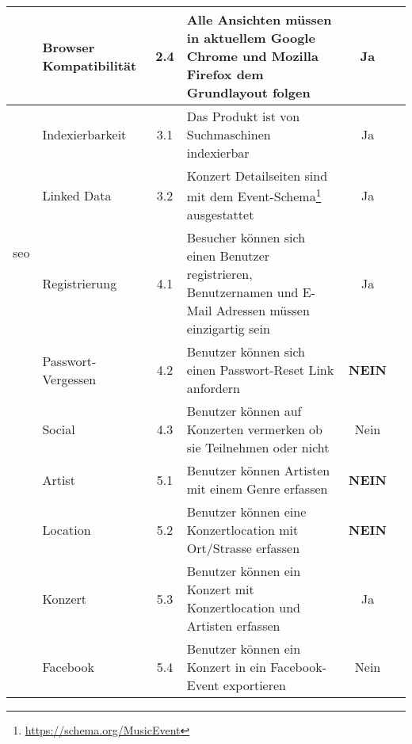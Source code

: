 \begin{longtable}[]{@{}p{1.9cm}p{2.5cm}cp{5.5cm}cc@{}}
                                  & Browser Kompatibilität     & 2.4          & Alle Ansichten müssen in aktuellem Google Chrome und Mozilla Firefox dem Grundlayout folgen                 & Ja                              \\
  \midrule
  \multirow{4}{*}{\acrshort{seo}} & Indexierbarkeit            & 3.1          & Das Produkt ist von Suchmaschinen indexierbar                                                               & Ja                              \\ \cline{2-6}
                                  & Linked Data                & 3.2          & Konzert Detailseiten sind mit dem Event-Schema\footnote{\url{https://schema.org/MusicEvent}} ausgestattet   & Ja                              \\
  \midrule
  \multirow{8}{*}{Benutzer}       & Registrierung              & 4.1          & Besucher können sich einen Benutzer registrieren, Benutzernamen und E-Mail Adressen müssen einzigartig sein & Ja                              \\ \cline{2-6}
                                  & Passwort-Vergessen         & 4.2          & Benutzer können sich einen Passwort-Reset Link anfordern                                                    & \textbf{NEIN}                   \\ \cline{2-6}
                                  & Social                     & 4.3          & Benutzer können auf Konzerten vermerken ob sie Teilnehmen oder nicht                                        & Nein                            \\
  \midrule
  \clearpage
  \multirow{6}{*}{Erfassung}      & Artist                     & 5.1          & Benutzer können Artisten mit einem Genre erfassen                                                           & \textbf{NEIN}                   \\ \cline{2-6}
                                  & Location                   & 5.2          & Benutzer können eine Konzertlocation mit Ort/Strasse erfassen                                               & \textbf{NEIN}                   \\ \cline{2-6}
                                  & Konzert                    & 5.3          & Benutzer können ein Konzert mit Konzertlocation und Artisten erfassen                                       & Ja                              \\ \cline{2-6}
                                  & Facebook                   & 5.4          & Benutzer können ein Konzert in ein Facebook-Event exportieren                                               & Nein                            \\

\end{longtable}
